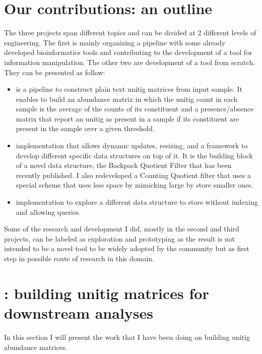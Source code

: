 \section{Our contributions: an outline}
The three projects span different topics and can be divided at 2 different levels of engineering. The first is mainly organizing a pipeline with some already developed bioinformatics tools and contributing to the development of a tool for \kmer information manipulation. The other two are development of a tool from scratch.\\
They can be presented as follow:
\begin{itemize}
	\item[\textbf{\muset}] is a pipeline to construct plain text unitig matrices from input sample. It enables to build an abundance matrix in which the unitig count in each sample is the average of the counts of its constituent \kmers and a presence/absence matrix that report an unitig as present in a sample if its constituent \kmers are present in the sample over a given threshold.\\
	\item[\smash{\stackunder{A \textbf{Quotient}}{\textbf{filter}}}] implementation that allows dynamic updates, resizing, and a framework to develop different specific data structures on top of it. It is the building block of a novel data structure, the Backpack Quotient Filter that has been recently published. I also redeveloped a Counting Quotient filter that uses a special scheme that uses less space by mimicking large \kmers by store smaller ones.\\ 
	\item[\smash{\stackunder{A \textbf{\skmer}}{\textbf{sorting}}}] implementation to explore a different data structure to store \kmers without indexing and allowing queries.
\end{itemize}
Some of the research and development I did, mostly in the second and third projects, can be labeled as exploration and prototyping as the result is not intended to be a novel tool to be widely adopted by the community but as first step in possible route of research in this domain.

\section{\muset: building unitig matrices for downstream analyses}
In this section I will present the work that I have been doing on building unitig abundance matrices.
